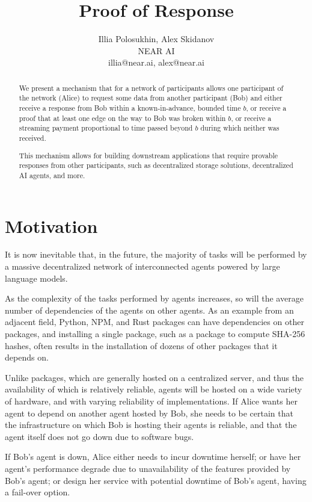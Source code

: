 \documentclass{article}
\title{Proof of Response}
\author{Illia Polosukhin, Alex Skidanov \\ NEAR AI \\ illia@near.ai, alex@near.ai}
\date{}
\begin{document}
\maketitle

\begin{abstract}
    We present a mechanism that for a network of participants allows one participant of the network (Alice) to request some data from another participant (Bob) and either receive a response from Bob within a known-in-advance, bounded time \( b \), or receive a proof that at least one edge on the way to Bob was broken within \( b \), or receive a streaming payment proportional to time passed beyond \( b \) during which neither was received.

    This mechanism allows for building downstream applications that require provable responses from other participants, such as decentralized storage solutions, decentralized AI agents, and more.
\end{abstract}

\section{Motivation}

It is now inevitable that, in the future, the majority of tasks will be performed by a massive decentralized network of interconnected agents powered by large language models.

As the complexity of the tasks performed by agents increases, so will the average number of dependencies of the agents on other agents. As an example from an adjacent field, Python, NPM, and Rust packages can have dependencies on other packages, and installing a single package, such as a package to compute SHA-256 hashes, often results in the installation of dozens of other packages that it depends on.

Unlike packages, which are generally hosted on a centralized server, and thus the availability of which is relatively reliable, agents will be hosted on a wide variety of hardware, and with varying reliability of implementations. If Alice wants her agent to depend on another agent hosted by Bob, she needs to be certain that the infrastructure on which Bob is hosting their agents is reliable, and that the agent itself does not go down due to software bugs.

If Bob's agent is down, Alice either needs to incur downtime herself; or have her agent's performance degrade due to unavailability of the features provided by Bob's agent; or design her service with potential downtime of Bob's agent, having a fail-over option.
\end{document}
